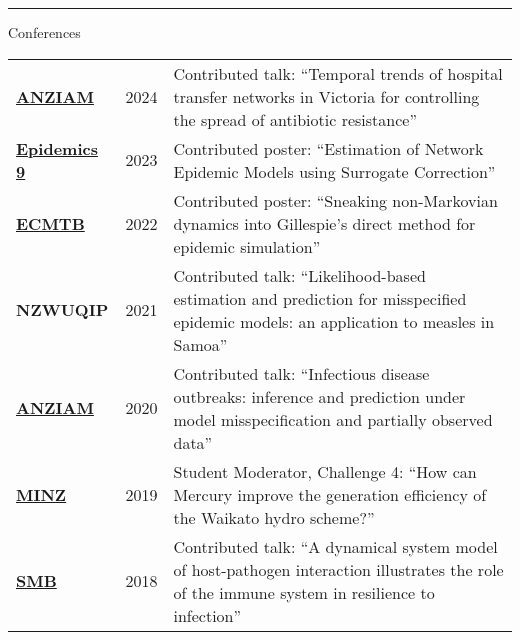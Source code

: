 \documentclass[paper=a4paper,fontsize=11pt]{scrartcl}
\newcommand{\pagerule}[1][2pt]{\noindent\rule{\textwidth}{#1}}
\newcommand{\usingfont}[2]{#1 #2 \par \normalsize \normalfont}
\newcommand{\sectionheader}[1]{\pagerule \vspace{0.05ex} \usingfont{\usefont{T1}{phv}{m}{v} \Large}{\noindent \hspace{-0.5em} #1} \vspace{0.75ex}}
\newlength{\spacebox}
\begin{document}
\sectionheader{Conferences}
\vspace{0.5ex}
\noindent 
\begin{tabular}{p{1.1\spacebox} p{0.5\spacebox} p{6.7\spacebox}}
\href{https://www.mathematics.org.au/sys/pages/plain.php?page\_id=39\&conf\_id=61}{\textbf{ANZIAM}} & 2024 & Contributed
talk: ``Temporal trends of hospital transfer networks in Victoria for
controlling the spread of antibiotic resistance'' \\
\href{https://www.elsevier.com/events/conferences/all/international-conference-on-infectious-disease-dynamics}{\textbf{Epidemics
9}} & 2023 & Contributed poster: ``Estimation of Network Epidemic Models
using Surrogate Correction'' \\
\href{https://ecmtb2022.org}{\textbf{ECMTB}} & 2022 & Contributed
poster: ``Sneaking non-Markovian dynamics into Gillespie's direct method
for epidemic simulation'' \\
\textbf{NZWUQIP} & 2021 & Contributed talk: ``Likelihood-based
estimation and prediction for misspecified epidemic models: an
application to measles in Samoa'' \\
\href{http://www.maths.mq.edu.au/ANZIAM2020}{\textbf{ANZIAM}} & 2020 & Contributed
talk: ``Infectious disease outbreaks: inference and prediction under
model misspecification and partially observed data'' \\
\href{https:/minz.org.nz/2019/}{\textbf{MINZ}} & 2019 & Student
Moderator, Challenge 4: ``How can Mercury improve the generation
efficiency of the Waikato hydro scheme?'' \\
\href{http://conferences.science.unsw.edu.au/SMB2018/}{\textbf{SMB}} & 2018 & Contributed
talk: ``A dynamical system model of host-pathogen interaction
illustrates the role of the immune system in resilience to
infection'' \\
\end{tabular}
\end{document}
